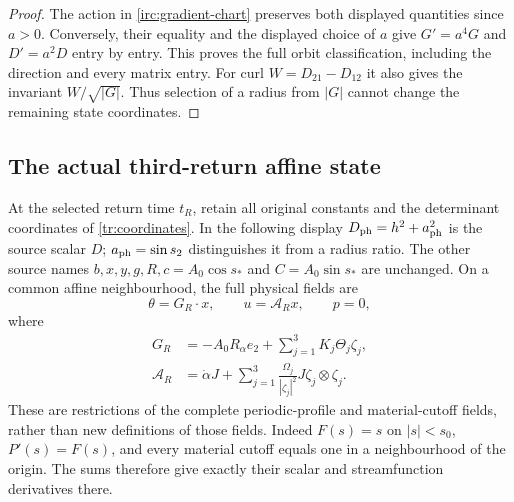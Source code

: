 \begin{proof}
The action in \eqref{irc:gradient-chart} preserves both displayed
quantities since $a>0$.  Conversely, their equality and the displayed
choice of $a$ give $G'=a^4G$ and $D'=a^2D$ entry by entry.
This proves the full orbit classification, including the direction
and every matrix entry.  For curl $W=D_{21}-D_{12}$ it also gives the
invariant $W/\sqrt{|G|}$.  Thus selection of a radius from $|G|$
cannot change the remaining state coordinates.
\end{proof}

\subsection{The actual third-return affine state}

At the selected return time $t_R$, retain all original constants and
the determinant coordinates of \eqref{tr:coordinates}.  In the
following display $D_{\rm ph}=h^2+a_{\rm ph}^2$ is the source scalar
$D$; $a_{\rm ph}=\sin s_2$ distinguishes it from a radius ratio.
The other source names $b,x,y,g,R,c=A_0\cos s_*$ and
$C=A_0\sin s_*$ are unchanged.  On a common affine neighbourhood,
the full physical fields are
\begin{equation}\label{irc:return-field}
 \theta=G_R\cdot x,\qquad u=\mathcal A_Rx,\qquad p=0,
\end{equation}
where
\begin{align}
 G_R&=-A_0R_\alpha e_2+
       \sum_{j=1}^3K_j\Theta_j\zeta_j,
 \label{irc:return-G}\\
 \mathcal A_R&=\dot\alpha J+
       \sum_{j=1}^3\frac{\Omega_j}{|\zeta_j|^2}
                 J\zeta_j\otimes\zeta_j.
 \label{irc:return-D}
\end{align}
These are restrictions of the complete periodic-profile and
material-cutoff fields, rather than new definitions of those fields.
Indeed $F(s)=s$ on $|s|<s_0$, $P'(s)=F(s)$, and every material cutoff
equals one in a neighbourhood of the origin.  The sums therefore
give exactly their scalar and streamfunction derivatives there.

